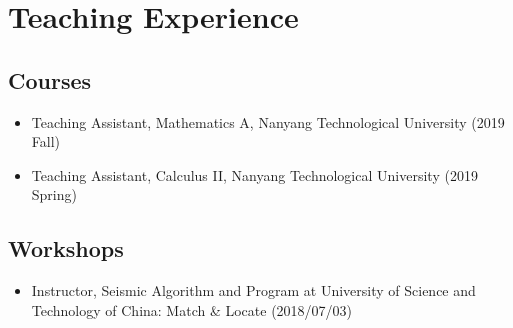 \section{Teaching Experience}

\subsection{Courses}
\begin{itemize}
\item Teaching Assistant, Mathematics A, Nanyang Technological University (2019 Fall)
\item Teaching Assistant, Calculus II, Nanyang Technological University (2019 Spring)
\end{itemize}

\subsection{Workshops}
\begin{itemize}
	\item Instructor, Seismic Algorithm and Program at University of Science and Technology of China: Match \& Locate (2018/07/03)
\end{itemize}
